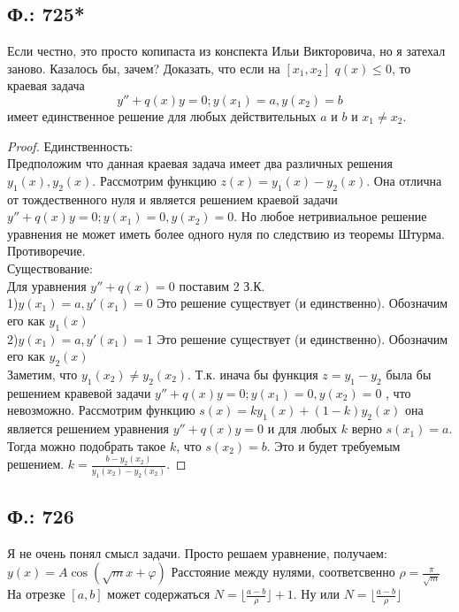 \documentclass{article}
\begin{document}
\subsection{Ф.: 725*}
\textcolor[rgb]{1,1,1}{Если честно, это просто копипаста из конспекта Ильи Викторовича, но я затехал заново. Казалось бы, зачем?}
Доказать, что если на $[x_1,x_2]$ $q(x)\leq 0$, то краевая задача 
\begin{equation}
y''+q(x)y=0 ;   y(x_1)=a,y(x_2)=b
\end{equation}
имеет единственное решение для любых действительных $a$ и $b$ и $x_1 \neq x_2$.
\begin{proof}
    Единственность:\\
Предположим что данная краевая задача имеет два различных решения $y_1(x),y_2(x)$. Рассмотрим функцию $z(x)=y_1(x)-y_2(x)$. Она отлична от тождественного нуля и является решением краевой задачи $y''+q(x)y=0 ;   y(x_1)=0,y(x_2)=0$. Но любое нетривиальное решение уравнения не может иметь более одного нуля по следствию из теоремы Штурма. Противоречие.\\

    Существование:\\
Для уравнения $y'' + q(x)=0$ поставим 2 З.К.\\
1)$y(x_1)=a,y'(x_1)=0$ Это решение существует (и единственно). Обозначим его как $y_1(x)$\\
2)$y(x_1)=a,y'(x_1)=1$ Это решение существует (и единственно). Обозначим его как $y_2(x)$\\
Заметим, что $y_1(x_2) \neq y_2(x_2)$. Т.к. инача бы функция $z=y_1-y_2$ была бы решением кравевой задачи $y''+q(x)y=0;   y(x_1)=0,y(x_2)=0$ , что невозможно.
Рассмотрим функцию $s(x)=k y_1(x)+(1-k) y_2(x)$ она является решением уравнения $y''+q(x)y=0 $ и для любых $k$ верно $s(x_1) = a$.
Тогда можно подобрать такое $k$, что $s(x_2)=b$. Это и будет требуемым решением. $k=\frac{b-y_2(x_2)}{y_1(x_2)-y_2(x_2)}$.
\end{proof}
\subsection{Ф.: 726}
Я не очень понял смысл задачи. Просто решаем уравнение, получаем: $y(x)=A \cos(\sqrt m x + \varphi)$ Расстояние между нулями, соответсвенно $\rho = \frac{\pi}{\sqrt m}$ На отрезке $[a,b]$ может содержаться $ N = \lfloor \frac{a-b}{\rho} \rfloor + 1$. Ну или  $N = \lfloor \frac{a-b}{\rho} \rfloor$
\end{document}
